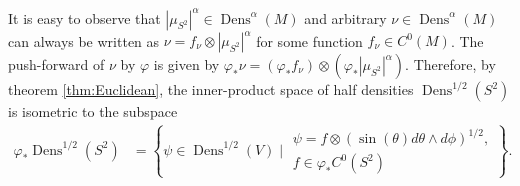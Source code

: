 \documentclass[a4paper, 12 pt]{amsart}
\newtheorem{prop}[thm]{Proposition}
\DeclareMathOperator{\Dens}{Dens}
\begin{document}
  It is easy to observe that $|\mu_{S^2}|^\alpha \in \Dens^\alpha(M)$
  and arbitrary $\nu \in \Dens^\alpha(M)$ can always be written
  as $\nu = f_{\nu} \otimes |\mu_{S^2}|^\alpha$ for some function 
  $f_\nu \in C^0(M)$.
  The push-forward of $\nu$ by $\varphi$ is given by
  $\varphi_*\nu = (\varphi_*f_\nu) \otimes (\varphi_*|\mu_{S^2}|^\alpha)$.
  Therefore, by theorem \ref{thm:Euclidean},
  the inner-product space of half densities $\Dens^{1/2}(S^2)$
  is isometric to the subspace
  \begin{align*}
    \varphi_* \Dens^{1/2}(S^2) &= \left\{ \psi \in \Dens^{1/2}(V) \mid 
    	\begin{array}{l}
		\psi = f \otimes  (\sin(\theta) d\theta \wedge d\phi)^{1/2} , \\
		f \in \varphi_*C^0(S^2)
	\end{array}
	\right\}.
  \end{align*}



\end{document}

